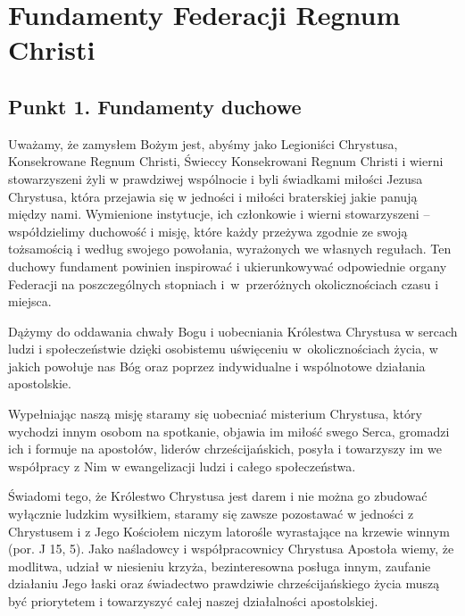 \chapter{Fundamenty Federacji Regnum Christi}


\section{Punkt 1. Fundamenty duchowe}




 Uważamy, że zamysłem Bożym jest, abyśmy jako Legioniści Chrystusa, Konsekrowane Regnum Christi, Świeccy Konsekrowani Regnum Christi i wierni stowarzyszeni żyli w prawdziwej wspólnocie i byli świadkami miłości Jezusa Chrystusa, która przejawia się w jedności  i miłości braterskiej jakie panują między nami. Wymienione instytucje, ich członkowie i wierni stowarzyszeni – współdzielimy duchowość i misję, które każdy przeżywa zgodnie ze swoją tożsamością i według swojego powołania, wyrażonych we własnych regułach. Ten duchowy fundament powinien inspirować i ukierunkowywać odpowiednie organy Federacji na poszczególnych stopniach \mbox{i w przeróżnych} okolicznościach czasu i miejsca.




 Dążymy do oddawania chwały Bogu i uobecniania Królestwa Chrystusa w sercach ludzi i społeczeństwie dzięki osobistemu uświęceniu \mbox{w okolicznościach} życia, w jakich powołuje nas Bóg oraz poprzez indywidualne i wspólnotowe działania apostolskie.


 
 Wypełniając naszą misję staramy się uobecniać misterium Chrystusa, który wychodzi innym osobom na spotkanie, objawia im miłość swego Serca, gromadzi ich i formuje na apostołów, liderów chrześcijańskich, posyła i towarzyszy im we współpracy z Nim w ewangelizacji ludzi i całego społeczeństwa.


 
 {Ś}wiadomi tego, że Królestwo Chrystusa jest darem i nie można go zbudować wyłącznie ludzkim wysiłkiem, staramy się zawsze pozostawać w jedności z Chrystusem i z Jego Kościołem niczym latorośle wyrastające na krzewie winnym (por. J 15, 5). Jako naśladowcy i współpracownicy Chrystusa Apostoła wiemy, że modlitwa, udział w niesieniu krzyża, bezinteresowna posługa innym, zaufanie działaniu Jego łaski oraz świadectwo prawdziwie chrześcijańskiego życia muszą być priorytetem i towarzyszyć całej naszej działalności apostolskiej.
 
